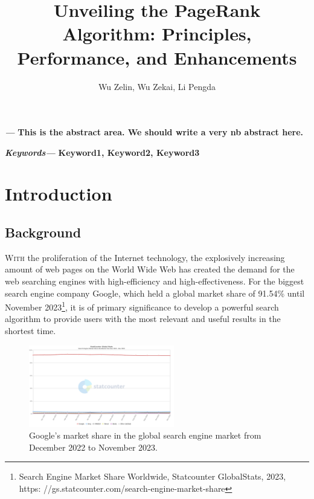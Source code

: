 \documentclass[lettersize,journal,12pt]{IEEEtran}
\renewenvironment{abstract}
{\fontsize{12}{14}\textit{\textbf{\abstractname---}}\bfseries\ignorespaces}
{}
\renewenvironment{IEEEkeywords}
{\fontsize{12}{14}\textit{\textbf{Keywords---}}\bfseries\ignorespaces}{}
\begin{document}
\onehalfspacing
\title{Unveiling the PageRank Algorithm: Principles, Performance, and Enhancements}
\author{Wu Zelin, Wu Zekai, Li Pengda}

\maketitle\thispagestyle{headings}
%

\begin{abstract}
	This is the abstract area. We should write a very nb abstract here.
\end{abstract}

\begin{IEEEkeywords}
	Keyword1, Keyword2, Keyword3
\end{IEEEkeywords}


\section{Introduction}

\subsection{Background}

\lettrine{W}{ith}
the proliferation of the Internet technology, the explosively increasing amount of web pages on the World Wide Web has created the demand for the web searching engines with high-efficiency and high-effectiveness.
For the biggest search engine company Google, which held a global market share of 91.54\% until November 2023\footnote[1]{Search Engine Market Share Worldwide, Statcounter GlobalStats, 2023, https:
	//gs.statcounter.com/search-engine-market-share}, it is of primary significance to develop a powerful search algorithm to provide users with the most relevant and useful results in the shortest time.

\begin{figure}[h]
	\centering
	\includegraphics[width=2.5in]{images/fig2.png}
	\caption{Google's market share in the global search engine market from December 2022 to November 2023.}
	\label{fig1}
\end{figure}
\end{document}
